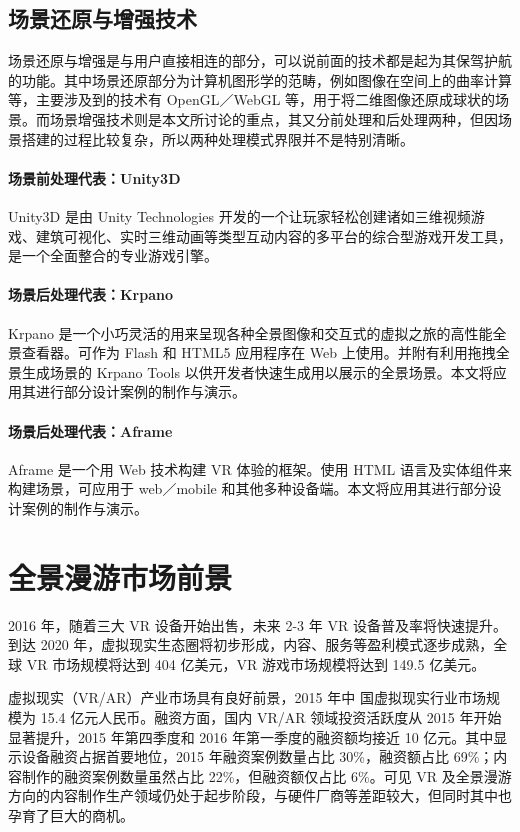 \subsection{场景还原与增强技术}
场景还原与增强是与用户直接相连的部分，可以说前面的技术都是起为其保驾护航的功能。其中场景还原部分为计算机图形学的范畴，例如图像在空间上的曲率计算等，主要涉及到的技术有 OpenGL／WebGL 等，用于将二维图像还原成球状的场景。而场景增强技术则是本文所讨论的重点，其又分前处理和后处理两种，但因场景搭建的过程比较复杂，所以两种处理模式界限并不是特别清晰。

\paragraph{场景前处理代表：Unity3D}

Unity3D 是由 Unity Technologies 开发的一个让玩家轻松创建诸如三维视频游戏、建筑可视化、实时三维动画等类型互动内容的多平台的综合型游戏开发工具，是一个全面整合的专业游戏引擎。

\paragraph{场景后处理代表：Krpano}
Krpano 是一个小巧灵活的用来呈现各种全景图像和交互式的虚拟之旅的高性能全景查看器。可作为 Flash 和 HTML5 应用程序在 Web 上使用。并附有利用拖拽全景生成场景的 Krpano Tools 以供开发者快速生成用以展示的全景场景。本文将应用其进行部分设计案例的制作与演示。

\paragraph{场景后处理代表：Aframe}
Aframe 是一个用 Web 技术构建 VR 体验的框架。使用 HTML 语言及实体组件来构建场景，可应用于 web／mobile 和其他多种设备端。本文将应用其进行部分设计案例的制作与演示。

\section{全景漫游市场前景}

2016 年，随着三大 VR 设备开始出售，未来 2-3 年 VR 设备普及率将快速提升。到达 2020 年，虚拟现实生态圈将初步形成，内容、服务等盈利模式逐步成熟，全球 VR 市场规模将达到 404 亿美元，VR 游戏市场规模将达到 149.5 亿美元。

虚拟现实（VR/AR）产业市场具有良好前景，2015 年中 国虚拟现实行业市场规模为 15.4 亿元人民币。融资方面，国内 VR/AR 领域投资活跃度从 2015 年开始显著提升，2015 年第四季度和 2016 年第一季度的融资额均接近 10 亿元。其中显示设备融资占据首要地位，2015 年融资案例数量占比 30\%，融资额占比 69\%；内容制作的融资案例数量虽然占比 22\%，但融资额仅占比 6\%。可见 VR 及全景漫游方向的内容制作生产领域仍处于起步阶段，与硬件厂商等差距较大，但同时其中也孕育了巨大的商机。

